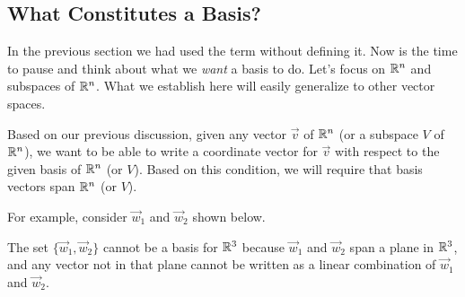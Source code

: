 \documentclass{ximera}
\begin{document}
\subsection*{What Constitutes a Basis?}

In the previous section we had used the term  without defining it.  Now is the time to pause and think about what we {\it want} a basis to do.  Let's focus on $\mathbb{R}^n$ and subspaces of $\mathbb{R}^n$.  What we establish here will easily generalize to other vector spaces.  


Based on our previous discussion, given any vector $\vec{v}$ of $\mathbb{R}^n$ (or a subspace $V$ of $\mathbb{R}^n$), we want to be able to write a coordinate vector for $\vec{v}$ with respect to the given basis of $\mathbb{R}^n$ (or $V$).  Based on this condition, we will require that basis vectors span $\mathbb{R}^n$ (or $V$).

For example, consider $\vec{w}_1$ and $\vec{w}_2$ shown below.  

\begin{image}
\end{image}
The set $\{\vec{w}_1, \vec{w}_2\}$ cannot be a basis for $\mathbb{R}^3$ because $\vec{w}_1$ and $\vec{w}_2$ span a plane in $\mathbb{R}^3$, and any vector not in that plane cannot be written as a linear combination of $\vec{w}_1$ and $\vec{w}_2$.
\end{document}
